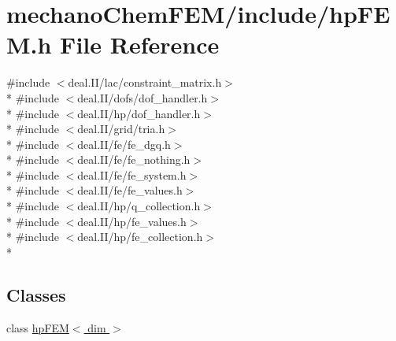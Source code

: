 \section{mechano\-Chem\-F\-E\-M/include/hp\-F\-E\-M.h File Reference}
\label{hp_f_e_m_8h}
{\ttfamily \#include $<$deal.\-I\-I/lac/constraint\-\_\-matrix.\-h$>$}\\*
{\ttfamily \#include $<$deal.\-I\-I/dofs/dof\-\_\-handler.\-h$>$}\\*
{\ttfamily \#include $<$deal.\-I\-I/hp/dof\-\_\-handler.\-h$>$}\\*
{\ttfamily \#include $<$deal.\-I\-I/grid/tria.\-h$>$}\\*
{\ttfamily \#include $<$deal.\-I\-I/fe/fe\-\_\-dgq.\-h$>$}\\*
{\ttfamily \#include $<$deal.\-I\-I/fe/fe\-\_\-nothing.\-h$>$}\\*
{\ttfamily \#include $<$deal.\-I\-I/fe/fe\-\_\-system.\-h$>$}\\*
{\ttfamily \#include $<$deal.\-I\-I/fe/fe\-\_\-values.\-h$>$}\\*
{\ttfamily \#include $<$deal.\-I\-I/hp/q\-\_\-collection.\-h$>$}\\*
{\ttfamily \#include $<$deal.\-I\-I/hp/fe\-\_\-values.\-h$>$}\\*
{\ttfamily \#include $<$deal.\-I\-I/hp/fe\-\_\-collection.\-h$>$}\\*
\subsection*{Classes}
\begin{DoxyCompactItemize}
\item 
class \hyperlink{classhp_f_e_m}{hp\-F\-E\-M$<$ dim $>$}
\end{DoxyCompactItemize}
